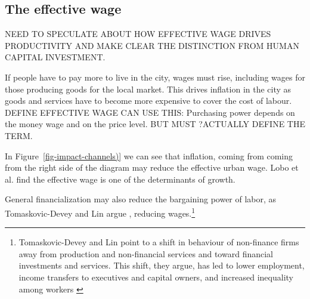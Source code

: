 \subsection{The effective wage}

{\color{red} NEED TO SPECULATE ABOUT HOW EFFECTIVE WAGE DRIVES PRODUCTIVITY AND MAKE CLEAR THE DISTINCTION FROM HUMAN CAPITAL INVESTMENT. } 

If people have to pay more to live in the city, wages must rise, including wages for those producing goods for the local market. This drives inflation in the city
as goods and services have to become more expensive to cover the cost of labour. DEFINE EFFECTIVE WAGE CAN USE THIS: Purchasing power depends on the money wage and on the price level. BUT MUST ?ACTUALLY DEFINE THE TERM.


In Figure~\ref{fig-impact-channels)} we can see that inflation, coming from coming from the right side of the diagram may reduce the effective urban wage. Lobo et al. find the effective wage is one of the determinants of growth.  


General financialization may also reduce the bargaining power of labor, as Tomaskovic-Devey and Lin argue \cite{tomaskovic-deveyFinancializationCausesInequality2013}, reducing wages.\footnote{Tomaskovic-Devey and Lin point to a shift in behaviour of non-finance firms away from production and non-financial services and toward financial investments and services. This shift, they argue, has led to lower employment, income transfers to executives and capital owners, and increased inequality among workers \cite{tomaskovic-deveyFinancializationCausesInequality2013}}


